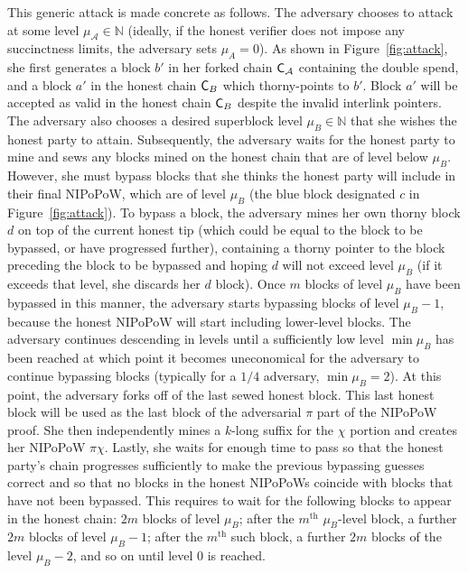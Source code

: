 This generic attack is made concrete as follows.
The adversary chooses to attack at some level $\mu_\mathcal{A} \in \mathbb{N}$ (ideally, if the honest verifier does not impose any succinctness limits, the adversary sets $\mu_A = 0$). As shown in Figure~\ref{fig:attack}, she first generates a block $b'$ in her forked chain $\mathsf{C}_\mathcal{A}$ containing the double spend, and a block $a'$ in the honest chain $\mathsf{C}_B$ which thorny-points to $b'$. Block $a'$ will be accepted as valid in the honest chain $\mathsf{C}_B$ despite the invalid interlink pointers. The adversary also chooses a desired superblock level $\mu_B \in \mathbb{N}$ that she wishes the honest party to attain. Subsequently, the adversary waits for the honest party to mine and sews any blocks mined on the honest chain that are of level below $\mu_B$. However, she must bypass blocks that she thinks the honest party will include in their final NIPoPoW, which are of level $\mu_B$ (the blue block designated $c$ in Figure~\ref{fig:attack}). To bypass a block, the adversary mines her own thorny block $d$ on top of the current honest tip (which could be equal to the block to be bypassed, or have progressed further), containing a thorny pointer to the block preceding the block to be bypassed and hoping $d$ will not exceed level $\mu_B$ (if it exceeds that level, she discards her $d$ block). Once $m$ blocks of level $\mu_B$ have been bypassed in this manner, the adversary starts bypassing blocks of level $\mu_B - 1$, because the honest NIPoPoW will start including lower-level blocks. The adversary continues descending in levels until a sufficiently low level $\min\mu_B$ has been reached at which point it becomes uneconomical for the adversary to continue bypassing blocks (typically for a $1/4$ adversary, $\min\mu_B = 2$). At this point, the adversary forks off of the last sewed honest block. This last honest block will be used as the last block of the adversarial $\pi$ part of the NIPoPoW proof. She then independently mines a $k$-long suffix for the $\chi$ portion and creates her NIPoPoW $\pi \chi$. Lastly, she waits for enough time to pass so that the honest party's chain progresses sufficiently to make the previous bypassing guesses correct and so that no blocks in the honest NIPoPoWs coincide with blocks that have not been bypassed. This requires to wait for the following blocks to appear in the honest chain: $2m$ blocks of level $\mu_B$; after the $m^\text{th}$ $\mu_B$-level block, a further $2m$ blocks of level $\mu_B - 1$; after the $m^\text{th}$ such block, a further $2m$ blocks of the level $\mu_B - 2$, and so on until level $0$ is reached.


